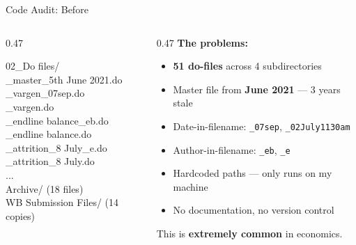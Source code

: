 \documentclass[aspectratio=169, 10pt]{beamer}
\begin{document}
\begin{frame}{Code Audit: Before}
\vskip-4pt
\begin{columns}[T]
\begin{column}{0.47\textwidth}
\begin{tcolorbox}[colback=DarkSlate, colframe=SoftCoral, boxrule=0.8pt, arc=2pt,
  left=4pt, right=4pt, top=3pt, bottom=3pt]
{\color{CoolGray}\ttfamily\tiny
02\_Do files/\\
\_master\_5th June 2021.do\\
\_vargen\_07sep.do\\
\_vargen.do\\
\_endline balance\_eb.do\\
\_endline balance.do\\
\_attrition\_8 July\_e.do\\
\_attrition\_8 July.do\\
\quad ...\\
\quad Archive/ {\color{CoolGray!50}(18 files)}\\
\quad WB Submission Files/ {\color{CoolGray!50}(14 copies)}
}
\end{tcolorbox}
\end{column}
\begin{column}{0.47\textwidth}
{\small\color{SoftCoral}\textbf{The problems:}}
\vskip3pt
\small
\begin{itemize}\setlength{\itemsep}{2pt}
  \item \textbf{51 do-files} across 4 subdirectories
  \item Master file from \textbf{June 2021} --- 3 years stale
  \item Date-in-filename: \texttt{\_07sep}, \texttt{\_02July1130am}
  \item Author-in-filename: \texttt{\_eb}, \texttt{\_e}
  \item Hardcoded paths --- only runs on my machine
  \item No documentation, no version control
\end{itemize}
\vskip3pt
\begin{tcolorbox}[quotebox, top=2pt, bottom=2pt]
\scriptsize This is \textbf{extremely common} in economics.
\end{tcolorbox}
\end{column}
\end{columns}
\end{frame}
\end{document}
